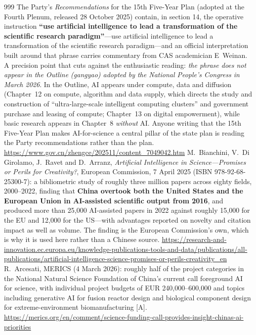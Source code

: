 \begin{thebibliography}{999}
 The Party's \emph{Recommendations} for the 15th Five-Year Plan (adopted at the Fourth Plenum, released 28 October 2025) contain, in section 14, the operative instruction \textbf{``use artificial intelligence to lead a transformation of the scientific research paradigm''}---use artificial intelligence to lead a transformation of the scientific research paradigm---and an official interpretation built around that phrase carries commentary from CAS academician E~Weinan. A precision point that cuts against the enthusiastic reading: \emph{the phrase does not appear in the Outline (gangyao) adopted by the National People's Congress in March 2026}. In the Outline, AI appears under compute, data and diffusion (Chapter~12 on compute, algorithm and data supply, which directs the study and construction of ``ultra-large-scale intelligent computing clusters'' and government purchase and leasing of compute; Chapter~13 on digital empowerment), while basic research appears in Chapter~8 \emph{without} AI. Anyone writing that the 15th Five-Year Plan makes AI-for-science a central pillar of the state plan is reading the Party recommendations rather than the plan. \url{https://www.gov.cn/zhengce/202511/content_7049042.htm}
 M.~Bianchini, V.~Di Girolamo, J.~Ravet and D.~Arranz, \emph{Artificial Intelligence in Science---Promises or Perils for Creativity?}, European Commission, 7 April 2025 (ISBN 978-92-68-25300-7): a bibliometric study of roughly three million papers across eighty fields, 2000--2022, finding that \textbf{China overtook both the United States and the European Union in AI-assisted scientific output from 2016}, and produced more than 25,000 AI-assisted papers in 2022 against roughly 15,000 for the EU and 12,000 for the US---with advantages reported on novelty and citation impact as well as volume. The finding is the European Commission's own, which is why it is used here rather than a Chinese source. \url{https://research-and-innovation.ec.europa.eu/knowledge-publications-tools-and-data/publications/all-publications/artificial-intelligence-science-promises-or-perils-creativity_en}
 R.~Arcesati, MERICS (4 March 2026): roughly half of the project categories in the National Natural Science Foundation of China's current call foreground AI for science, with individual project budgets of EUR 240{,}000--600{,}000 and topics including generative AI for fusion reactor design and biological component design for extreme-environment biomanufacturing [A]. \url{https://merics.org/en/comment/science-funding-call-provides-insight-chinas-ai-priorities}

\end{thebibliography}
